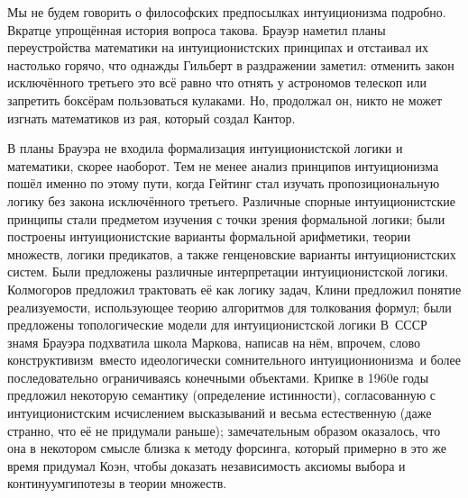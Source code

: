 Мы не будем говорить о философских предпосылках интуиционизма
подробно. Вкратце упрощённая история вопроса такова. Брауэр%
наметил планы переустройства математики на интуиционистских
принципах и отстаивал их настолько горячо, что однажды Гильберт%
в раздражении заметил: отменить закон исключённого третьего\т
это всё равно что отнять у астрономов телескоп или запретить
боксёрам пользоваться кулаками. Но, продолжал он, никто не может
изгнать математиков из рая, который создал Кантор.%

В планы Брауэра%
не входила формализация интуиционистской логики
и математики, скорее наоборот. Тем не менее анализ принципов
интуиционизма пошёл именно по этому пути, когда Гейтинг%
стал
изучать пропозициональную логику без закона исключённого
третьего. Различные спорные интуиционистские принципы стали
предметом изучения с точки зрения формальной логики; были
построены интуиционистские варианты формальной арифметики, теории
множеств, логики предикатов, а также генценовские варианты
интуиционистских систем. Были предложены различные интерпретации
интуиционистской логики. Колмогоров%
предложил трактовать её как
 логику задач, Клини%
предложил понятие 
реализуемости, использующее теорию алгоритмов для толкования
формул; были предложены топологические модели для
интуиционистской логики  В~СССР знамя Брауэра подхватила
школа Маркова,%
написав на нём, впрочем,  слово 
конструктивизм\ вместо идеологически сомнительного 
интуиционионизма\ и более последовательно ограничиваясь
конечными объектами. Крипке%
в 1960\д е годы предложил некоторую
семантику (определение истинности), согласованную с
интуиционистским исчислением высказываний и весьма естественную
(даже странно, что её не придумали раньше); замечательным
образом оказалось, что она в некотором смысле близка к методу
форсинга, который примерно в это же время придумал Коэн,%
чтобы
доказать независимость аксиомы выбора и континуум\д гипотезы в
теории множеств.

